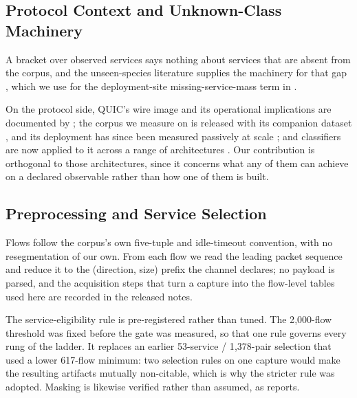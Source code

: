 \documentclass[sigconf,anonymous,review]{acmart}
\begin{document}
\subsection{Protocol Context and Unknown-Class Machinery}

A bracket over observed services says nothing about services that are absent
from the corpus, and the unseen-species literature supplies the machinery for
that gap \citep{orlitsky2016optimal,eriksson2026unseen}, which we use for the
deployment-site missing-service-mass term in .

On the protocol side, QUIC's wire image and its operational implications are
documented by \citet{kuhlewind2022rfc}; the corpus we measure on is released with
its companion dataset \citep{cesnet2025cesnet,luxemburk2023cesnet}, and its
deployment has since been measured passively at scale \citep{mucke2025waiting};
and classifiers are now applied to it across a range of architectures
\citep{luxemburk2023encryptedquic,zhang2023applicationquic,lin2022etbert,zhao2023yatc,meng2023netgpt,cui2025trafficllm,hu2022opencbd,smith2021website,li2023facing,jerabek2025simple}.
Our contribution is orthogonal to those architectures, since it concerns what any
of them can achieve on a declared observable rather than how one of them is
built.

\subsection{Preprocessing and Service Selection}
\label{sec:appendix/preprocessing}

Flows follow the corpus's own five-tuple and idle-timeout convention, with no
resegmentation of our own. From each flow we read the leading packet sequence and
reduce it to the (direction, size) prefix the channel declares; no payload is
parsed, and the acquisition steps that turn a capture into the flow-level tables
used here are recorded in the released notes.

The service-eligibility rule is pre-registered rather than tuned. The
2{,}000-flow threshold was fixed before the gate was measured, so that one rule
governs every rung of the ladder. It replaces an earlier 53-service /
1{,}378-pair selection that used a lower 617-flow minimum: two selection rules
on one capture would make the resulting artifacts mutually non-citable, which is
why the stricter rule was adopted. Masking is likewise verified rather than
assumed, as  reports.
\end{document}
